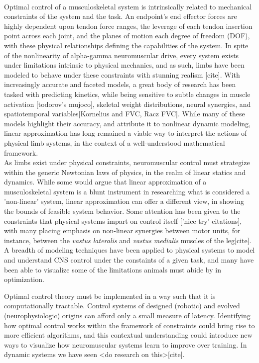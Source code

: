 \\
Optimal control of a musculoskeletal system is intrinsically related to mechanical constraints of the system and the task. 
An endpoint's end effector forces are highly dependent upon tendon force ranges, the leverage of each tendon insertion point across each joint, and the planes of motion each degree of freedom (DOF), with these physical relationships defining the capabilities of the system.
In spite of the nonlinearity of alpha-gamma neuromuscular drive, every system exists under limitations intrinsic to physical mechanics, and as such, limbs have been modeled to behave under these constraints with stunning realism [cite]. With increasingly accurate and faceted models, a great body of research has been tasked with predicting kinetics, while being sensitive to subtle changes in muscle activation [todorov's mujoco], skeletal weight distributions, neural synergies, and spatiotemporal variables[Kornelius and FVC, Racz FVC].
While many of these models highlight their accuracy, and attribute it to nonlinear dynamic modeling, linear approximation has long-remained a viable way to interpret the actions of physical limb systems, in the context of a well-understood mathematical framework.\\

As limbs exist under physical constraints, neuromuscular control must strategize within the generic Newtonian laws of physics, in the realm of linear statics and dynamics.
While some would argue that linear approximation of a musculoskeletal system is a blunt instrument in researching what is considered a 'non-linear' system, linear approximation can offer a different view, in showing the bounds of feasible system behavior.
Some attention has been given to the constraints that physical systems impart on control itself ['nice try' citations], with many placing emphasis on non-linear synergies between motor units, for instance, between the \textit{vastus lateralis} and \textit{vastus medialis} muscles of the leg[cite].
A breadth of modeling techniques have been applied to physical systems to model and understand CNS control under the constaints of a given task, and many have been able to visualize some of the limitations animals must abide by in optimization.

Optimal control theory must be implemented in a way such that it is computationally tractable. Control systems of designed (robotic) and evolved (neurophysiologic) origins can afford only a small measure of latency.
Identifying how optimal control works within the framework of constraints could bring rise to more efficient algorithms, and this contextual understanding could introduce new ways to visualize how neuromuscular systems learn to improve over training.
In dynamic systems we have seen <do research on this>[cite].

